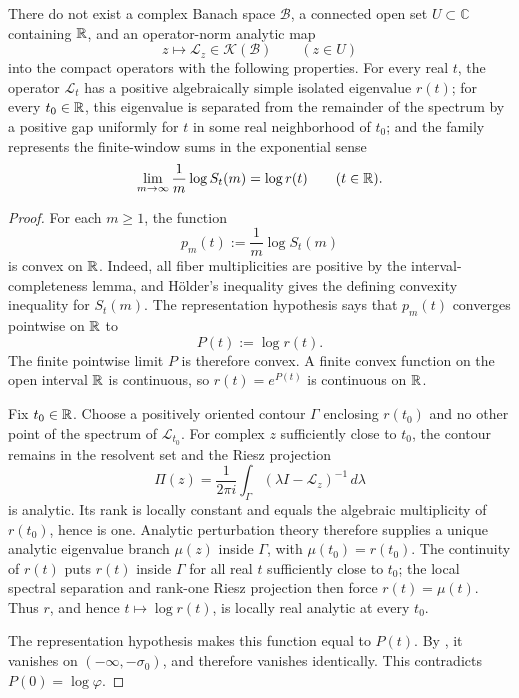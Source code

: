\begin{proposition}
\label{prop:no-analytic-compact-representation}
There do not exist a complex Banach space \(\mathcal B\), a connected open
set \(U\subset\mathbb C\) containing \(\mathbb{R}\), and an operator-norm analytic
map
\[
 z\longmapsto\mathcal L_z\in\mathcal K(\mathcal B)
 \qquad(z\in U)
\]
into the compact operators with the following properties.  For every real
\(t\), the operator \(\mathcal L_t\) has a positive algebraically simple
isolated eigenvalue \(r(t)\); for every \(t_0\in\mathbb{R}\), this eigenvalue is
separated from the remainder of the spectrum by a positive gap uniformly for
\(t\) in some real neighborhood of \(t_0\); and the family represents the
finite-window sums in the exponential sense
\[
 \lim_{m\to\infty}\frac1m\log S_t(m)=\log r(t)
 \qquad(t\in\mathbb{R}).
\]
\end{proposition}

\begin{proof}
For each \(m\ge1\), the function
\[
 p_m(t):=\frac1m\log S_t(m)
\]
is convex on \(\mathbb{R}\).  Indeed, all fiber multiplicities are positive by the
interval-completeness lemma, and H\"older's inequality gives the defining
convexity inequality for \(S_t(m)\).  The representation hypothesis says that
\(p_m(t)\) converges pointwise on \(\mathbb{R}\) to
\[
 P(t):=\log r(t).
\]
The finite pointwise limit \(P\) is therefore convex.  A finite convex function
on the open interval \(\mathbb{R}\) is continuous, so \(r(t)=e^{P(t)}\) is continuous
on \(\mathbb{R}\).

Fix \(t_0\in\mathbb{R}\).  Choose a positively oriented contour \(\Gamma\) enclosing
\(r(t_0)\) and no other point of the spectrum of \(\mathcal L_{t_0}\).  For
complex \(z\) sufficiently close to \(t_0\), the contour remains in the
resolvent set and the Riesz projection
\[
 \Pi(z)=\frac{1}{2\pi i}\int_\Gamma
  (\lambda I-\mathcal L_z)^{-1}\,d\lambda
\]
is analytic.  Its rank is locally constant and equals the algebraic
multiplicity of \(r(t_0)\), hence is one.  Analytic perturbation theory
\cite[Chap.~VII, Sec.~1]{Kato1995} therefore supplies a unique analytic
eigenvalue branch \(\mu(z)\) inside \(\Gamma\), with
\(\mu(t_0)=r(t_0)\).  The continuity of \(r(t)\) puts \(r(t)\) inside
\(\Gamma\) for all real \(t\) sufficiently close to \(t_0\); the local
spectral separation and rank-one Riesz projection then force
\(r(t)=\mu(t)\).  Thus \(r\), and hence \(t\mapsto\log r(t)\), is locally real
analytic at every \(t_0\).

The representation hypothesis makes this function equal to \(P(t)\).  By
, it vanishes on
\(( -\infty,-\sigma_0)\), and therefore vanishes identically.  This
contradicts \(P(0)=\log\varphi\).
\end{proof}


